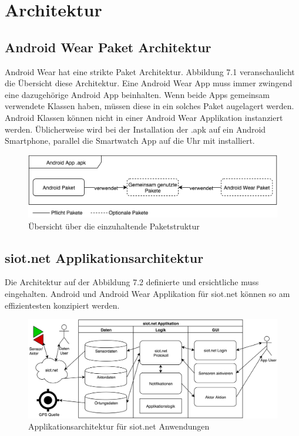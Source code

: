 \chapter{Architektur}
\section{Android Wear Paket Architektur}
Android Wear hat eine strikte Paket Architektur. Abbildung 7.1 veranschaulicht die Übersicht diese Architektur. Eine Android Wear App muss immer zwingend eine dazugehörige Android App beinhalten. Wenn beide Apps gemeinsam verwendete Klassen haben, müssen diese in ein solches Paket augelagert werden. Android Klassen können nicht in einer Android Wear Applikation instanziert werden. Üblicherweise wird bei der Installation der .apk auf ein Android Smartphone, parallel die Smartwatch App auf die Uhr mit installiert.
\begin{figure}[h]
  \centering
  \includegraphics[scale=0.4]{98_Bilder/07_Architektur/AndroidPaketArchitektur}
  \caption[Übersicht Android Wear Paket Architektur]{Übersicht über die einzuhaltende Paketstruktur}
\end{figure}
\section{siot.net Applikationsarchitektur}
Die Architektur auf der Abbildung 7.2 definierte und ersichtliche muss eingehalten. Android und Android Wear Applikation für siot.net können so am effizientesten konzipiert werden.
\begin{figure}[h]
  \centering
  \includegraphics[scale=0.3]{98_Bilder/07_Architektur/siotAppArchitektur}
  \caption[Übersicht siot.net Applikationsarchitektur]{Applikationsarchitektur für siot.net Anwendungen}
\end{figure}
